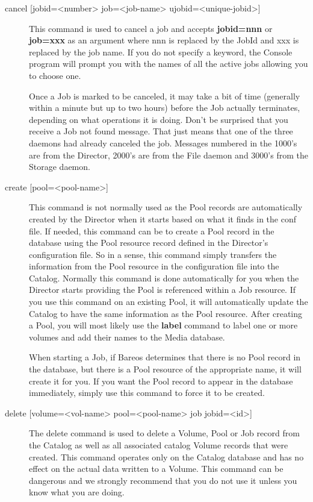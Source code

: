 \begin{description}
\item [{cancel [jobid={\textless}number{\textgreater} job={\textless}job-name{\textgreater} ujobid={\textless}unique-jobid{\textgreater}]}]
   This command is used to cancel a job and accepts {\bf jobid=nnn} or {\bf
   job=xxx} as an argument where nnn is replaced by the JobId and xxx is
   replaced by the job name.  If you do not specify a keyword, the Console
   program will prompt you with the names of all the active jobs allowing
   you to choose one.

   Once a Job is marked to be canceled, it may take a bit of time
   (generally within a minute but up to two hours) before the Job actually
   terminates, depending on what operations it is doing.
   Don't be surprised that you receive a Job not found message. That just
   means that one of the three daemons had already canceled the job.
   Messages numbered in the 1000's are from the Director, 2000's are from
   the File daemon and 3000's from the Storage daemon.


\item [{create [pool={\textless}pool-name{\textgreater}]}]
   This command is not normally used as the Pool records are automatically
   created by the Director when it starts based on what it finds in
   the conf file.  If needed, this command can be
   to create a Pool record in the database using the
   Pool resource record defined in the Director's configuration file.  So
   in a sense, this command simply transfers the information from the Pool
   resource in the configuration file into the Catalog.  Normally this
   command is done automatically for you when the Director starts providing
   the Pool is referenced within a Job resource.  If you use this command
   on an existing Pool, it will automatically update the Catalog to have
   the same information as the Pool resource.  After creating a Pool, you
   will most likely use the {\bf label} command to label one or more
   volumes and add their names to the Media database.

   When starting a Job, if Bareos determines that there is no Pool record
   in the database, but there is a Pool resource of the appropriate name,
   it will create it for you.  If you want the Pool record to appear in the
   database immediately, simply use this command to force it to be created.

\item [{delete [volume={\textless}vol-name{\textgreater} pool={\textless}pool-name{\textgreater}  job
   jobid={\textless}id{\textgreater}]}]
   The delete command is used to delete a Volume, Pool or Job record from
   the Catalog as well as all associated catalog Volume records that were
   created.  This command operates only on the Catalog database and has no
   effect on the actual data written to a Volume.  This command can be
   dangerous and we strongly recommend that you do not use it unless you
   know what you are doing.


\end{description}
